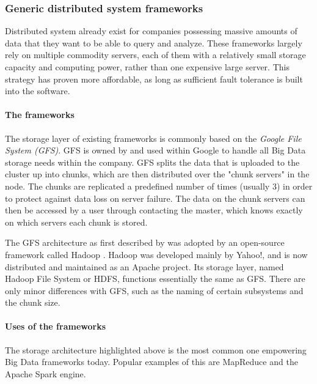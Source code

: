 \subsubsection{Generic distributed system frameworks}
Distributed system already exist for companies possessing massive amounts of data that they want to be able to query and analyze. These frameworks largely rely on multiple commodity servers, each of them with a relatively small storage capacity and computing power, rather than one expensive large server. This strategy has proven more affordable, as long as sufficient fault tolerance is built into the software.

\paragraph{The frameworks}
The storage layer of existing frameworks is commonly based on the \textit{Google File System\cite{Ghem03} (GFS)}. GFS is owned by and used within Google to handle all Big Data storage needs within the company. GFS splits the data that is uploaded to the cluster up into chunks, which are then distributed over the "chunk servers" in the node. The chunks are replicated a predefined number of times (usually 3) in order to protect against data loss on server failure. The data on the chunk servers can then be accessed by a user through contacting the master, which knows exactly on which servers each chunk is stored.\cite{Ghem03} %

The GFS architecture as first described by \citep{Ghem03} was adopted by an open-source framework called Hadoop \cite{Shv10}. Hadoop was developed mainly by Yahoo!, and is now distributed and maintained as an Apache project. Its storage layer, named Hadoop File System or HDFS, functions essentially the same as GFS. There are only minor differences with GFS, such as the naming of certain subsystems and the chunk size. %

\paragraph{Uses of the frameworks}
The storage architecture highlighted above is the most common one empowering Big Data frameworks today. Popular examples of this are MapReduce and the Apache Spark engine.

